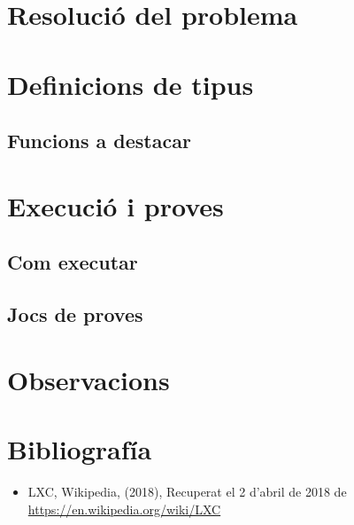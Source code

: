 \documentclass[12pt]{article}
\begin{document}
\section{Resolució del problema}

\section{Definicions de tipus}
\subsection{Funcions a destacar}

\section{Execució i proves}
\subsection{Com executar}
\subsection{Jocs de proves}

\section{Observacions}

\newpage
\section{Bibliografía}

\begin{itemize}[label={}]

\item LXC, Wikipedia, (2018), Recuperat el 2 d'abril de 2018 de \url{https://en.wikipedia.org/wiki/LXC}

\end{itemize}
\end{document}
